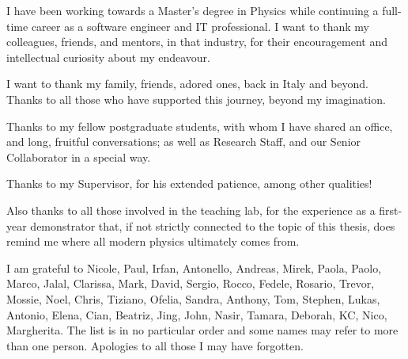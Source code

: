 I have been working towards a Master's degree in Physics
while continuing a full-time career as a software engineer and IT professional. 
I want to thank my colleagues, friends, and mentors, in that industry,
for their encouragement and intellectual curiosity about my endeavour. 

I want to thank my family, friends, adored ones, back in Italy and beyond.
Thanks to all those who have supported this journey, beyond my imagination.

Thanks to my fellow postgraduate students, with whom I have shared
an office, and long, fruitful conversations;
as well as Research Staff, and our Senior Collaborator in a special way. 

Thanks to my Supervisor, for his extended patience, among other qualities!

Also thanks to all those involved in the teaching lab, 
for the experience as a first-year demonstrator that, 
if not strictly connected to the topic of this thesis, 
does remind me where all modern physics ultimately comes from.

I am grateful to Nicole, Paul, Irfan, Antonello, Andreas, Mirek, Paola, Paolo, Marco,
Jalal, Clarissa, Mark, David, Sergio, Rocco, Fedele, Rosario, Trevor, Mossie, Noel, Chris, Tiziano, Ofelia,
Sandra, Anthony, Tom, Stephen, Lukas, Antonio, Elena, Cian, Beatriz, Jing, John, Nasir, Tamara, 
Deborah, KC, Nico, Margherita. The list is in no particular order and some names may refer to more than one person.
Apologies to all those I may have forgotten.
